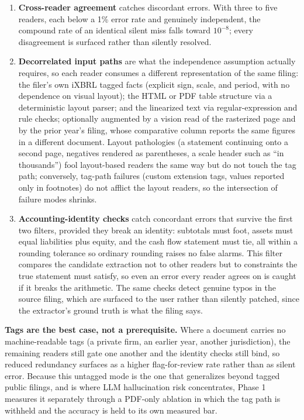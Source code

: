 \documentclass[11pt]{article}
\newcommand{\lead}[2]{\par\addvspace{5pt}\textbf{\textcolor{#1}{#2}}}
\begin{document}
\begin{enumerate}
  \item \textbf{Cross-reader agreement} catches discordant errors. With three to five readers, each below a 1\% error rate and genuinely independent, the compound rate of an identical silent miss falls toward $10^{-8}$; every disagreement is surfaced rather than silently resolved.
  \item \textbf{Decorrelated input paths} are what the independence assumption actually requires, so each reader consumes a different representation of the same filing: the filer's own iXBRL tagged facts (explicit sign, scale, and period, with no dependence on visual layout); the HTML or PDF table structure via a deterministic layout parser; and the linearized text via regular-expression and rule checks; optionally augmented by a vision read of the rasterized page and by the prior year's filing, whose comparative column reports the same figures in a different document. Layout pathologies (a statement continuing onto a second page, negatives rendered as parentheses, a scale header such as ``in thousands'') fool layout-based readers the same way but do not touch the tag path; conversely, tag-path failures (custom extension tags, values reported only in footnotes) do not afflict the layout readers, so the intersection of failure modes shrinks.
  \item \textbf{Accounting-identity checks} catch concordant errors that survive the first two filters, provided they break an identity: subtotals must foot, assets must equal liabilities plus equity, and the cash flow statement must tie, all within a rounding tolerance so ordinary rounding raises no false alarms. This filter compares the candidate extraction not to other readers but to constraints the true statement must satisfy, so even an error every reader agrees on is caught if it breaks the arithmetic. The same checks detect genuine typos in the source filing, which are surfaced to the user rather than silently patched, since the extractor's ground truth is what the filing says.
\end{enumerate}

\lead{navytwo}{Tags are the best case, not a prerequisite.} Where a document carries no machine-readable tags (a private firm, an earlier year, another jurisdiction), the remaining readers still gate one another and the identity checks still bind, so reduced redundancy surfaces as a higher flag-for-review rate rather than as silent error. Because this untagged mode is the one that generalizes beyond tagged public filings, and is where LLM hallucination risk concentrates, Phase 1 measures it separately through a PDF-only ablation in which the tag path is withheld and the accuracy is held to its own measured bar.
\end{document}
